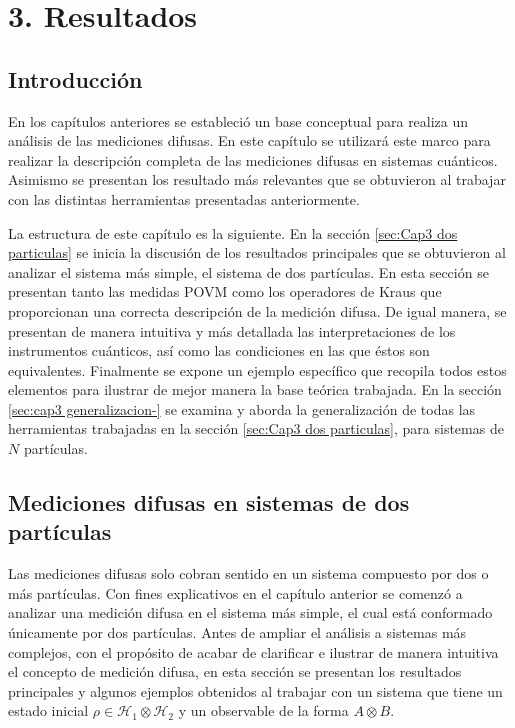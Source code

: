  \chapter[RESULTADOS]{3. Resultados}\label{cap3:resultados}
\section{Introducción} %

    

En los capítulos anteriores se estableció un base conceptual para realiza un
análisis de las mediciones difusas. En este capítulo se utilizará este marco
para realizar la descripción completa de las mediciones difusas en sistemas
cuánticos. Asimismo se presentan los resultado más relevantes que se obtuvieron
al trabajar con las distintas herramientas presentadas anteriormente. 

La estructura de este capítulo es la siguiente. En la sección {\ref{sec:Cap3
dos particulas}} se inicia la discusión de los resultados principales que se
obtuvieron al analizar el sistema más simple, el sistema de dos partículas. En
esta sección se presentan tanto las medidas POVM como los operadores de Kraus
que proporcionan una correcta descripción de la medición difusa. De igual
manera,  se presentan de manera intuitiva y más detallada las interpretaciones
de los instrumentos cuánticos, así como las condiciones en las que éstos son
equivalentes. Finalmente se expone un ejemplo específico que recopila todos
estos elementos para ilustrar de mejor manera la base teórica trabajada. En la
sección {\ref{sec:cap3 generalizacion-}} se examina y aborda la generalización
de todas las herramientas trabajadas en la sección {\ref{sec:Cap3 dos
particulas}}, para sistemas de $N$ partículas.

\section{Mediciones difusas en sistemas de dos partículas}\label{sec:Cap3 dos particulas} %
Las mediciones difusas solo cobran sentido en un sistema compuesto por dos o
más partículas. Con fines explicativos en el capítulo anterior se comenzó a
analizar una medición difusa en el sistema más simple, el cual está conformado
únicamente por dos partículas. Antes de ampliar el análisis a sistemas más
complejos, con el propósito de acabar de clarificar e ilustrar de manera
intuitiva el concepto de medición difusa, en esta sección se presentan los
resultados principales y algunos ejemplos obtenidos al trabajar con un sistema
que tiene un estado inicial $\rho \in \mathcal{H}_1\otimes \mathcal{H}_2$ y un
observable de la forma $A\otimes B$.\par





